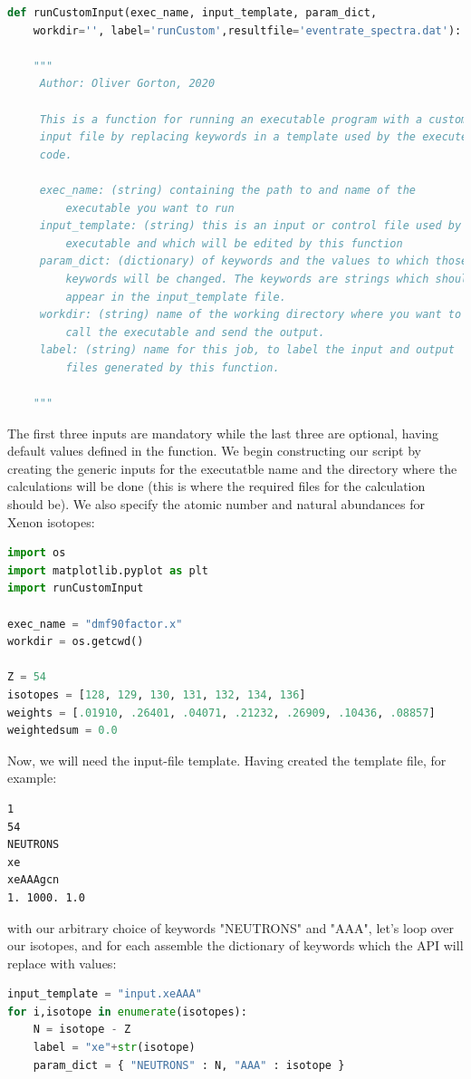 \documentclass[12pt]{article}
\begin{document}
\begin{lstlisting}[language=python]
def runCustomInput(exec_name, input_template, param_dict,
    workdir='', label='runCustom',resultfile='eventrate_spectra.dat'):

    """
     Author: Oliver Gorton, 2020

     This is a function for running an executable program with a custom
     input file by replacing keywords in a template used by the executed
     code.

     exec_name: (string) containing the path to and name of the
         executable you want to run
     input_template: (string) this is an input or control file used by the 
         executable and which will be edited by this function
     param_dict: (dictionary) of keywords and the values to which those 
         keywords will be changed. The keywords are strings which should 
         appear in the input_template file. 
     workdir: (string) name of the working directory where you want to 
         call the executable and send the output.
     label: (string) name for this job, to label the input and output 
         files generated by this function.

    """
\end{lstlisting}
The first three inputs are mandatory while the last three are optional, having
default values defined in the function.
We begin constructing our script by creating the generic inputs for the
executatble name and the directory where the calculations will be done (this is
where the required files for the calculation should be). We also specify the 
atomic number and natural abundances for Xenon isotopes:
\begin{lstlisting}[language=python]
import os
import matplotlib.pyplot as plt
import runCustomInput

exec_name = "dmf90factor.x"
workdir = os.getcwd()

Z = 54
isotopes = [128, 129, 130, 131, 132, 134, 136]
weights = [.01910, .26401, .04071, .21232, .26909, .10436, .08857]
weightedsum = 0.0
\end{lstlisting}
Now, we will need the input-file template. Having created the template file, for
example:
\begin{verbatim}
1
54
NEUTRONS
xe
xeAAAgcn
1. 1000. 1.0
\end{verbatim}
with our arbitrary choice of keywords "NEUTRONS" and "AAA", 
let's loop over our isotopes, and for each assemble the dictionary of
keywords which the API will replace with values:
\begin{lstlisting}[language=python]
input_template = "input.xeAAA"
for i,isotope in enumerate(isotopes):
    N = isotope - Z
    label = "xe"+str(isotope)
    param_dict = { "NEUTRONS" : N, "AAA" : isotope }
\end{lstlisting}
\end{document}
